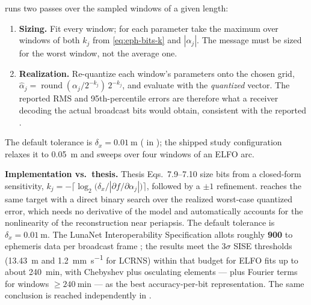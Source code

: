 runs two passes over the  sampled
windows of a given length:
\begin{enumerate}[leftmargin=1.6em]
  \item \textbf{Sizing.} Fit every window; for each parameter take the maximum
    over windows of both $k_j$ from \cref{eq:eph-bits-k} and
    $|\alpha_j|$. The message must be sized for the worst window, not the
    average one.
  \item \textbf{Realization.} Re-quantize each window's parameters onto the
    chosen grid, $\hat\alpha_j = \operatorname{round}(\alpha_j/2^{-k_j})\,2^{-k_j}$,
    and evaluate  with the \emph{quantized} vector. The
    reported RMS and 95th-percentile errors are therefore what a receiver
    decoding the actual broadcast bits would obtain, consistent with the
    reported .
\end{enumerate}

The default tolerance is $\delta_x = \SI{0.01}{\meter}$
( in ); the shipped
study configuration  relaxes it to
\SI{0.05}{\meter} and sweeps
 over four windows of an ELFO arc.

\begin{lupntnote}
  \textbf{Implementation vs.\ thesis.} Thesis Eqs.~7.9--7.10 size bits from a
  closed-form sensitivity,
  $k_j = -\big\lceil\log_2\!\big(\delta_x / |\partial f/\partial\alpha_j|\big)\big\rceil$,
  followed by a $\pm 1$ refinement. \lupnt{} reaches the same target with a
  direct binary search over the realized worst-case quantized error, which
  needs no derivative of the model and automatically accounts for the
  nonlinearity of the reconstruction near periapsis. The default tolerance is
  $\delta_x = \SI{0.01}{\meter}$. The LunaNet Interoperability Specification
  \citep{lunanet2022} allots roughly \textbf{\SI{900}{\bit}} to ephemeris data
  per broadcast frame \citep[\S1.2.3]{iiyama2026thesis}; the results
  \citep[Table~7.2]{iiyama2026thesis} meet the $3\sigma$ SISE thresholds
  (\SI{13.43}{\meter} and \SI{1.2}{\milli\meter\per\second} for LCRNS) within
  that budget for ELFO fits up to about \SI{240}{\minute}, with Chebyshev plus
  osculating elements --- plus Fourier terms for windows
  $\ge \SI{240}{\minute}$ --- as the best accuracy-per-bit representation. The
  same conclusion is reached independently in
  \citep{cortinovis2023ephemeris,cortinovis2024navi}.
\end{lupntnote}


